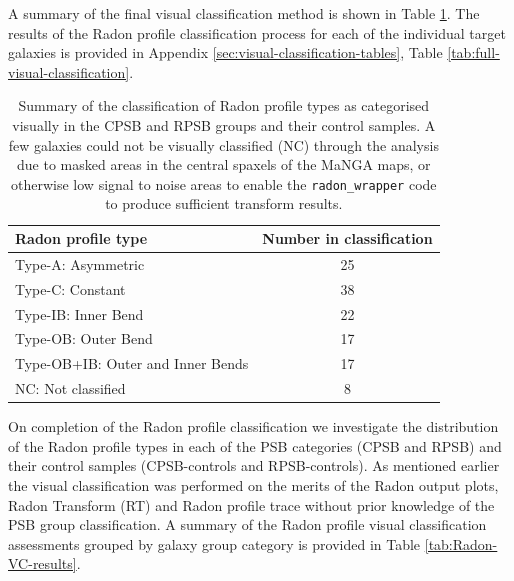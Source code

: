 A summary of the final visual classification method is shown in Table \ref{tab:Radon-class-summary}. The results of the Radon profile classification process for each of the individual target galaxies is provided in Appendix \ref{sec:visual-classification-tables}, Table \ref{tab:full-visual-classification}. 

\begin{table}
    \centering
    \caption[Summary of Radon profile type visual classifications]{Summary of the classification of Radon profile types as categorised visually in the CPSB and RPSB groups and their control samples. A few galaxies could not be visually classified (NC) through the analysis due to masked areas in the central spaxels of the MaNGA maps, or otherwise low signal to noise areas to enable the \texttt{radon\_wrapper} code to produce sufficient transform results.}
    \label{tab:Radon-class-summary}
    \begin{tabular}{lc}
    \hline
    Radon profile type & Number in classification \\
    \hline
    Type-A: Asymmetric & 25 \\
    Type-C: Constant & 38 \\
    Type-IB: Inner Bend & 22 \\
    Type-OB: Outer Bend & 17 \\
    Type-OB+IB: Outer and Inner Bends & 17 \\
    NC: Not classified & 8 \\
    \hline
    \end{tabular}
\end{table}

On completion of the Radon profile classification we investigate the distribution of the Radon profile types in each of the PSB categories (CPSB and RPSB) and their control samples (CPSB-controls and RPSB-controls). As mentioned earlier the visual classification was performed on the merits of the Radon output plots, Radon Transform (RT) and Radon profile trace without prior knowledge of the PSB group classification. A summary of the Radon profile visual classification assessments grouped by galaxy group category is provided in Table \ref{tab:Radon-VC-results}.

